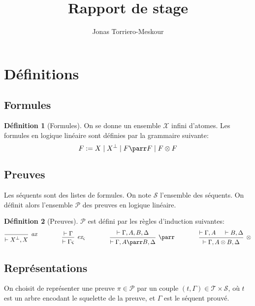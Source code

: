 \documentclass[11pt,a4paper]{article}
\title{Rapport de stage}
\author{Jonas Torriero-Meskour}
\theoremstyle{plain}
\theoremstyle{definition}
\newtheorem{definition}{Définition}
\theoremstyle{remark}
\newcommand*{\orth}{^\perp}
\newcommand*{\tensor}{\otimes}
\newcommand*{\hypv}[1]{\hypo{\vdash #1}}
\newcommand*{\axv}[1]{\infer{0}[\ensuremath{\mathit{ax}}]{\vdash #1}}
\newcommand*{\tensorv}[1]{\infer{2}[\ensuremath{\tensor}]{\vdash #1}}
\newcommand*{\parrv}[1]{\infer{1}[\ensuremath{\parr}]{\vdash #1}}
\newcommand*{\permv}[2]{\infer{1}[\ensuremath{\textit{ex}_{#1}}]{\vdash #2}}
\newcommand*{\permapp}[2]{#2 #1}
\newcommand*{\someperm}{\varsigma}
\newcommand*{\someproof}{\pi}
\newcommand*{\sequent}{\Gamma}
\newcommand*{\proofs}{\ensuremath{\mathcal{P}}}
\newcommand*{\sequents}{\ensuremath{\mathcal{S}}}
\newcommand*{\trees}{\ensuremath{\mathcal{T}}}
\newcommand*{\representationslarge}{\ensuremath{\trees \times \sequents}}
\begin{document}
\maketitle

\section{Définitions}

\subsection{Formules}
\begin{definition}[Formules]
On se donne un ensemble $\mathcal{X}$ infini d'atomes. Les formules en logique linéaire sont définies par la grammaire suivante:
\begin{equation*}
F := X \mid X\orth \mid F \parr F \mid F \tensor F
\end{equation*}
\end{definition}

\subsection{Preuves}
Les séquents sont des listes de formules. On note $\sequents$ l'ensemble des séquents. On définit alors l'ensemble \proofs{} des preuves en logique linéaire.
\begin{definition}[Preuves]
\proofs{} est défini par les règles d'induction suivantes:
\begin{equation*}
\begin{prooftree}
  \axv{X\orth, X}
\end{prooftree}
\qquad\qquad
\begin{prooftree}
  \hypv{\Gamma}
  \permv{\someperm}{\permapp{\someperm}{\Gamma}}
\end{prooftree}
\qquad\qquad
\begin{prooftree}
  \hypv{\Gamma, A, B, \Delta}
  \parrv{\Gamma, A \parr B, \Delta}
\end{prooftree}
\qquad\qquad
\begin{prooftree}
  \hypv{\Gamma, A}
  \hypv{B, \Delta}
  \tensorv{\Gamma, A \tensor B, \Delta}
\end{prooftree}
\end{equation*}
\end{definition}

\subsection{Représentations}
On choisit de représenter une preuve $\someproof \in \mathcal{P}$ par un couple $(t, \sequent) \in \representationslarge$, où $t$ est un arbre encodant le squelette de la preuve, et $\sequent$ est le séquent prouvé.
\end{document}
